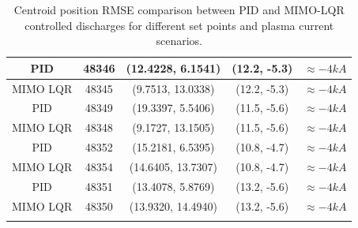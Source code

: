 \begin{center}
\begin{longtable}{||c| c| c| c|c||}
		\hline
		PID & 48346 & (12.4228,	6.1541)  & (12.2, -5.3)& $\approx -4 kA$\\ 
		\hline
		MIMO LQR & 48345 & (9.7513,	13.0338) & (12.2, -5.3)& $\approx -4 kA$ \\
		\hline
		PID & 48349 & (19.3397,	5.5406)  & (11.5, -5.6)&$\approx -4 kA$  \\ 
		\hline
		MIMO LQR & 48348 & (9.1727,	13.1505) & (11.5, -5.6)&$\approx -4 kA$  \\
		\hline
		PID & 48352 &  (15.2181,	6.5395) & (10.8, -4.7) &$\approx -4 kA$ \\ 
		\hline
		MIMO LQR & 48354 & (14.6405,	13.7307) & (10.8, -4.7)& $\approx -4 kA$ \\
		\hline
		PID & 48351 &  (13.4078, 5.8769) & (13.2, -5.6)& $\approx -4 kA$ \\ 
		\hline
		MIMO LQR & 48350 & (13.9320,	14.4940) & (13.2, -5.6)&$\approx -4 kA$  \\[1ex]
		\hline
		\caption{Centroid position RMSE comparison between PID and MIMO-LQR controlled discharges for different set points and plasma current scenarios.}
	\end{longtable}
\label{TableControl}

\end{center}



